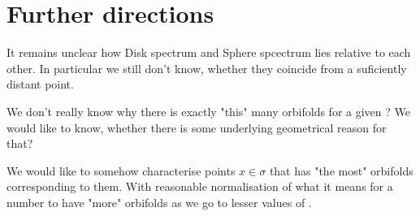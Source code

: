 \section{Further directions}
It remains unclear how Disk spectrum and Sphere spcectrum lies relative to each other. 
In particular we still don't know, whether they coincide from a suficiently distant point.

We don't really know why there is exactly "this" many orbifolds for a given \Eoc? 
We would like to know, whether there is some underlying geometrical reason for that?

We would like to somehow characterise points $x \in \sigma$ that has "the most" 
orbifolds corresponding to them. With reasonable normalisation of what it means for a number
to have "more" orbifolds as we go to lesser values of \Eoc. 


